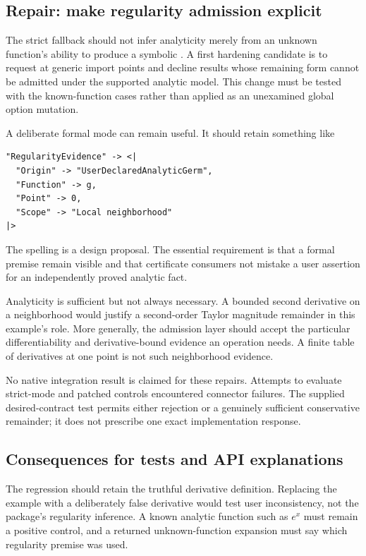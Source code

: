 \documentclass[11pt,letterpaper]{article}
\newcommand{\code}[1]{\texttt{\detokenize{#1}}}
\begin{document}
\subsection{Repair: make regularity admission explicit}
The strict fallback should not infer analyticity merely from an unknown function's ability to produce a symbolic \code{SeriesData}. A first hardening candidate is to request \code{Analytic -> False} at generic import points and decline results whose remaining form cannot be admitted under the supported analytic model. This change must be tested with the known-function cases rather than applied as an unexamined global option mutation.

A deliberate formal mode can remain useful. It should retain something like
\begin{lstlisting}
"RegularityEvidence" -> <|
  "Origin" -> "UserDeclaredAnalyticGerm",
  "Function" -> g,
  "Point" -> 0,
  "Scope" -> "Local neighborhood"
|>
\end{lstlisting}
The spelling is a design proposal. The essential requirement is that a formal premise remain visible and that certificate consumers not mistake a user assertion for an independently proved analytic fact.

Analyticity is sufficient but not always necessary. A bounded second derivative on a neighborhood would justify a second-order Taylor magnitude remainder in this example's role. More generally, the admission layer should accept the particular differentiability and derivative-bound evidence an operation needs. A finite table of derivatives at one point is not such neighborhood evidence.

No native integration result is claimed for these repairs. Attempts to evaluate strict-mode and patched controls encountered connector failures. The supplied desired-contract test permits either rejection or a genuinely sufficient conservative remainder; it does not prescribe one exact implementation response.

\subsection{Consequences for tests and API explanations}
The regression should retain the truthful derivative definition. Replacing the example with a deliberately false derivative would test user inconsistency, not the package's regularity inference. A known analytic function such as $e^x$ must remain a positive control, and a returned unknown-function expansion must say which regularity premise was used.
\end{document}
